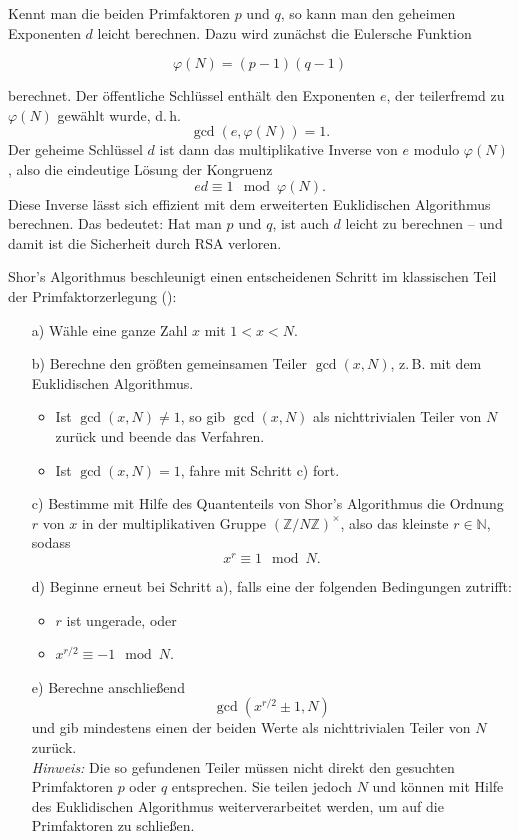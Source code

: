 Kennt man die beiden Primfaktoren \( p \) und \( q \), so kann man den geheimen Exponenten \( d \) leicht berechnen. Dazu wird zunächst die Eulersche Funktion 
\begin{definition}\label{def:eulerscheFunktion}
\[
\varphi(N) = (p - 1)(q - 1)
\]
\end{definition}
berechnet. Der öffentliche Schlüssel enthält den Exponenten \( e \), der teilerfremd zu \( \varphi(N) \) gewählt wurde, d.\,h.
\[
\gcd(e, \varphi(N)) = 1.
\]
Der geheime Schlüssel \( d \) ist dann das multiplikative Inverse von \( e \) modulo \( \varphi(N) \), also die eindeutige Lösung der Kongruenz
\[
ed \equiv 1 \mod \varphi(N).
\]
Diese Inverse lässt sich effizient mit dem erweiterten Euklidischen Algorithmus berechnen. Das bedeutet: Hat man \( p \) und \( q \), ist auch \( d \) leicht zu berechnen – und damit ist die Sicherheit durch RSA verloren.

Shor's Algorithmus beschleunigt einen entscheidenen Schritt im klassischen Teil der Primfaktorzerlegung (\cite{shor_polynomial-time_1994}):

\begin{itemize}
  \item[a)] Wähle eine ganze Zahl \(x\) mit \(1 < x < N\).
  
  \item[b)] Berechne den größten gemeinsamen Teiler \(\gcd(x, N)\), z.\,B. mit dem Euklidischen Algorithmus.  
  \begin{itemize}
    \item Ist \(\gcd(x, N) \ne 1\), so gib \(\gcd(x, N)\) als nichttrivialen Teiler von \(N\) zurück und beende das Verfahren.
    \item Ist \(\gcd(x, N) = 1\), fahre mit Schritt c) fort.
  \end{itemize}
  
  \item[c)] Bestimme mit Hilfe des Quantenteils von Shor's Algorithmus die Ordnung \(r\) von \(x\) in der multiplikativen Gruppe \((\mathbb{Z}/N\mathbb{Z})^\times\), also das kleinste \(r \in \mathbb{N}\), sodass
  \[
  x^r \equiv 1 \mod N.
  \]
  
  \item[d)] Beginne erneut bei Schritt a), falls eine der folgenden Bedingungen zutrifft:
  \begin{itemize}
    \item \(r\) ist ungerade, oder
    \item \(x^{r/2} \equiv -1 \mod N\).
  \end{itemize}
  
  \item[e)] Berechne anschließend
  \[
  \gcd(x^{r/2} \pm 1, N)
  \]
  und gib mindestens einen der beiden Werte als nichttrivialen Teiler von \(N\) zurück.\\
  \[
  \]
  \textit{Hinweis:} Die so gefundenen Teiler müssen nicht direkt den gesuchten Primfaktoren \(p\) oder \(q\) entsprechen. Sie teilen jedoch \(N\) und können mit Hilfe des Euklidischen Algorithmus weiterverarbeitet werden, um auf die Primfaktoren zu schließen.
\end{itemize}

